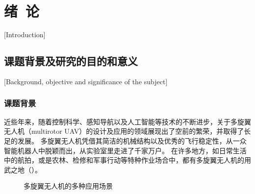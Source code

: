 
\chapter{绪\ 论}[Introduction]

\section{课题背景及研究的目的和意义}[Background, objective and significance of the subject]

\subsection{课题背景}
近些年来，随着控制科学、感知导航以及人工智能等技术的不断进步，关于多旋翼无人机（multirotor UAV）的设计及应用的领域展现出了空前的繁荣，并取得了长足的发展。
多旋翼无人机凭借其简洁的机械结构以及优秀的飞行稳定性，从一众智能机器人中脱颖而出，从实验室里走进了千家万户。
在许多地方，如日常生活中的航拍，或是农林、检修和军事行动等特种作业场合中，都有多旋翼无人机的用武之地（）。

\begin{figure}[!ht]
    \setlength{\subfigcapskip}{-1bp}
    \centering
    \begin{minipage}{\textwidth}

    \centering
    \subfigure{\label{fig:aerial_photo}}\addtocounter{subfigure}{-2}
    \hspace{0.2em}
    \subfigure{\label{fig:farming}}\addtocounter{subfigure}{-2}

    \subfigure{\label{fig:inspection}}\addtocounter{subfigure}{-2}
    \hspace{0.2em}
    \subfigure{\label{fig:logistics}}\addtocounter{subfigure}{-2}
    
    \end{minipage}
    \caption{多旋翼无人机的多种应用场景}
    \label{fig:applications}
\end{figure}

